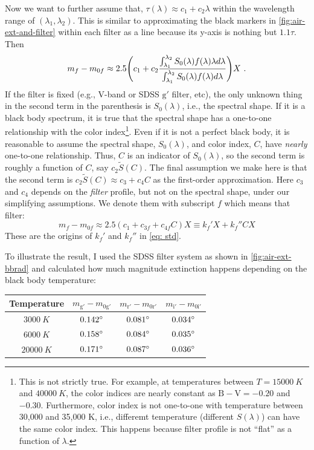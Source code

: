 Now we want to further assume that, $ \tau(\lambda) \approx c_1 + c_2 \lambda $ within the wavelength range of $ (\lambda_1, \lambda_2) $. This is similar to approximating the black markers in \cref{fig:air-ext-and-filter} within each filter as a line because its y-axis is nothing but $ 1.1 \tau $. Then
\begin{equation}
  m_f - m_{0f} 
    \approx 2.5 
    \qty (c_1 + c_2\frac{\int_{\lambda_1}^{\lambda_2} S_0(\lambda) f(\lambda) \lambda d\lambda}
      {\int_{\lambda_1}^{\lambda_2} S_0(\lambda) f(\lambda) d\lambda} ) X ~.
\end{equation}
If the filter is fixed (e.g., V-band or SDSS $ \mathrm{g'} $ filter, etc), the only unknown thing in the second term in the parenthesis is $ S_0(\lambda) $, i.e., the spectral shape. If it is a black body spectrum, it is true that the spectral shape has a one-to-one relationship with the color index\footnote{This is not strictly true. For example, at temperatures between $ T = \SI{15000}{K} $ and $ \SI{40000}{K} $, the color indices are nearly constant as $ \mathrm{B - V} = -0.20 $ and $ -0.30 $. Furthermore, color index is not one-to-one with temperature between 30,000 and 35,000 K, i.e., differemt temperature (different $ S(\lambda) $) can have the same color index. This happens because filter profile is not ``flat'' as a function of $ \lambda $.}.
Even if it is not a perfect black body, it is reasonable to assume the spectral shape, $ S_0(\lambda) $, and color index, $ C $, have \textit{nearly} one-to-one relationship. Thus, $ C $ is an indicator of $ S_0(\lambda) $, so the second term is roughly a function of $ C $, say $ c_2 \tilde{S}(C) $. The final assumption we make here is that the second term is $ c_2 \tilde{S} (C) \approx c_3 + c_4 C $ as the first-order approximation. Here $ c_3 $ and $ c_4 $ depends on the \textit{filter} profile, but not on the spectral shape, under our simplifying assumptions. We denote them with subscript $ f $ which means that filter:
\begin{equation}\label{key}
  m_f - m_{0f} 
  \approx 2.5 (c_1 + c_{3f} + c_{4f} C) X 
  \equiv k_f' X + k_f'' CX
\end{equation}
 These are the origins of $ k_f' $ and $ k_f'' $ in \cref{eq: std}.

To illustrate the result, I used the SDSS filter system as shown in \cref{fig:air-ext-bbrad} and calculated how much magnitude extinction happens depending on the black body temperature:

\begin{table}[ht!]
\centering
  \begin{tabular}{c||ccc}
  Temperature  & $ m_\mathrm{g'} - m_\mathrm{0 g'} $ & $ m_\mathrm{r'} - m_\mathrm{0 r'} $ & $ m_\mathrm{i'} - m_\mathrm{0 i'} $ \\
  \hline
  $ \SI{3000}{K} $  & $ \m{0.142} $ & $ \m{0.081} $ & $ \m{0.034} $ \\
  $ \SI{6000}{K} $  & $ \m{0.158} $ & $ \m{0.084} $ & $ \m{0.035} $ \\
  $ \SI{20000}{K} $ & $ \m{0.171} $ & $ \m{0.087} $ & $ \m{0.036} $ \\
  \end{tabular}
\end{table}


